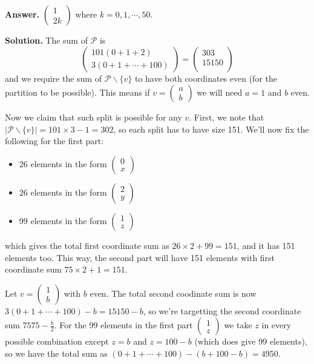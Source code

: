 \documentclass[11pt,a4paper]{article}
\newcommand{\<}{\langle}
\renewcommand{\>}{\rangle}
\begin{document}
\begin{enumerate}
	\textbf{Answer.} $\begin{pmatrix}1 \\ 2k\end{pmatrix}$ where $k=0, 1, \cdots , 50$. 
	
	\textbf{Solution.} The sum of $\mathcal{P}$ is 
	\[
	\begin{pmatrix} 101(0+1+2) \\ 3(0+1+\cdots + 100) \end{pmatrix}
	=\begin{pmatrix}
	303 \\ 15150\\
	\end{pmatrix}
	\]
	and we require the sum of $\mathcal{P}\backslash\{v\}$ to have both coordinates even (for the partition to be possible). This means if $v=\begin{pmatrix}a\\b\end{pmatrix}$ we will need $a=1$ and $b$ even. 
	
	Now we claim that such split is possible for any $v$. First, we note that $|\mathcal{P}\backslash\{v\}|=101\times 3-1=302$, so each split has to have size 151. We'll now fix the following for the first part: 
	\begin{itemize}
		\item 26 elements in the form $\begin{pmatrix}
		0 \\ x
		\end{pmatrix}$
		\item 26 elements in the form $\begin{pmatrix}
		2 \\ y
		\end{pmatrix}$
		\item 99 elements in the form $\begin{pmatrix}
		1 \\ z
		\end{pmatrix}$
	\end{itemize}
	which gives the total first coordinate sum as $26\times 2+99=151$, and it has 151 elements too. This way, the second part will have 151 elements with first coordinate sum $75\times 2+1=151$. 
	
	Let $v=\begin{pmatrix}1\\b\end{pmatrix}$ with $b$ even. The total second coodinate sum is now $3(0+1+\cdots+100)-b=15150-b$, so we're targetting the second coordinate sum $7575-\frac b2$. 
	For the 99 elements in the first part $\begin{pmatrix}1 \\ z\end{pmatrix}$ we take $z$ in every possible combination except $z=b$ and $z=100-b$ (which does give 99 elements), so we have the total sum as $(0+1+\cdots+100)-(b+100-b)=4950$. 
	

\end{enumerate}
\end{document}
